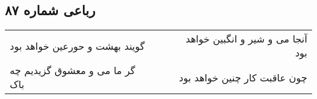 \begin{center}
\section*{رباعی شماره ۸۷}
\label{sec:sh087}
\begin{longtable}{l p{0.5cm} r}
گویند بهشت و حورعین خواهد بود
&&
آنجا می و شیر و انگبین خواهد بود
\\
گر ما می و معشوق گزیدیم چه باک
&&
چون عاقبت کار چنین خواهد بود
\\
\end{longtable}
\end{center}
